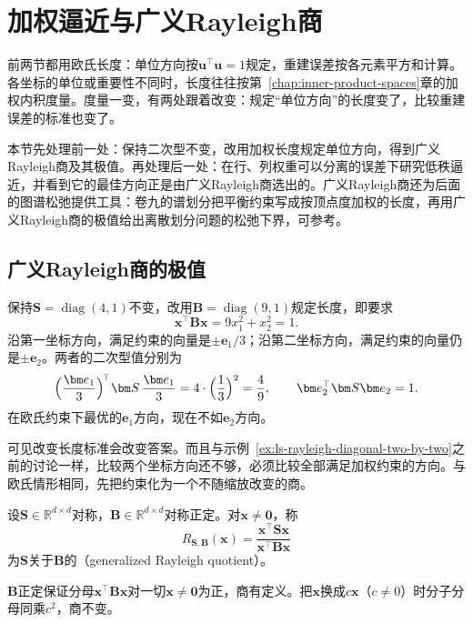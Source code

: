 
\section{加权逼近与广义Rayleigh商}
\label{sec:ls-generalized-rayleigh}

前两节都用欧氏长度：单位方向按$\bm u^\top\bm u=1$规定，重建误差按各元素平方和计算。各坐标的单位或重要性不同时，长度往往按第~\ref{chap:inner-product-spaces}章的加权内积度量。度量一变，有两处跟着改变：规定“单位方向”的长度变了，比较重建误差的标准也变了。

本节先处理前一处：保持二次型不变，改用加权长度规定单位方向，得到广义Rayleigh商及其极值。再处理后一处：在行、列权重可以分离的误差下研究低秩逼近，并看到它的最佳方向正是由广义Rayleigh商选出的。广义Rayleigh商还为后面的图谱松弛提供工具：卷九的谱划分把平衡约束写成按顶点度加权的长度，再用广义Rayleigh商的极值给出离散划分问题的松弛下界，可参考。

\subsection{广义Rayleigh商的极值}
\label{sec:ls-generalized-eigen-reduction}
\label{sec:ls-generalized-eigen-check}

保持$\bm S=\operatorname{diag}(4,1)$不变，改用$\bm B=\operatorname{diag}(9,1)$规定长度，即要求
\[
 \bm x^\top\bm B\bm x=9x_1^2+x_2^2=1 .
\]
沿第一坐标方向，满足约束的向量是$\pm\bm e_1/3$；沿第二坐标方向，满足约束的向量仍是$\pm\bm e_2$。两者的二次型值分别为
\[
 \Bigl(\frac{\bm e_1}3\Bigr)^{\!\top}\bm S\,\frac{\bm e_1}3=4\cdot\Bigl(\frac13\Bigr)^2=\frac49,\qquad
 \bm e_2^\top\bm S\bm e_2=1 .
\]
在欧氏约束下最优的$\bm e_1$方向，现在不如$\bm e_2$方向。

可见改变长度标准会改变答案。而且与示例~\ref{ex:ls-rayleigh-diagonal-two-by-two}之前的讨论一样，比较两个坐标方向还不够，必须比较全部满足加权约束的方向。与欧氏情形相同，先把约束化为一个不随缩放改变的商。
\begin{definition}[广义Rayleigh商]
\label{def:ls-generalized-rayleigh-quotient}
设$\bm S\in\mathbb R^{d\times d}$对称，$\bm B\in\mathbb R^{d\times d}$对称正定。对$\bm x\neq\bm0$，称
\begin{equation}
 R_{\bm S,\bm B}(\bm x)=\frac{\bm x^\top\bm S\bm x}{\bm x^\top\bm B\bm x}
 \label{eq:ls-generalized-rayleigh-quotient}
\end{equation}
为$\bm S$关于$\bm B$的（generalized Rayleigh quotient）。
\end{definition}
$\bm B$正定保证分母$\bm x^\top\bm B\bm x$对一切$\bm x\neq\bm0$为正，商有定义。把$\bm x$换成$c\bm x$（$c\neq0$）时分子分母同乘$c^2$，商不变。

